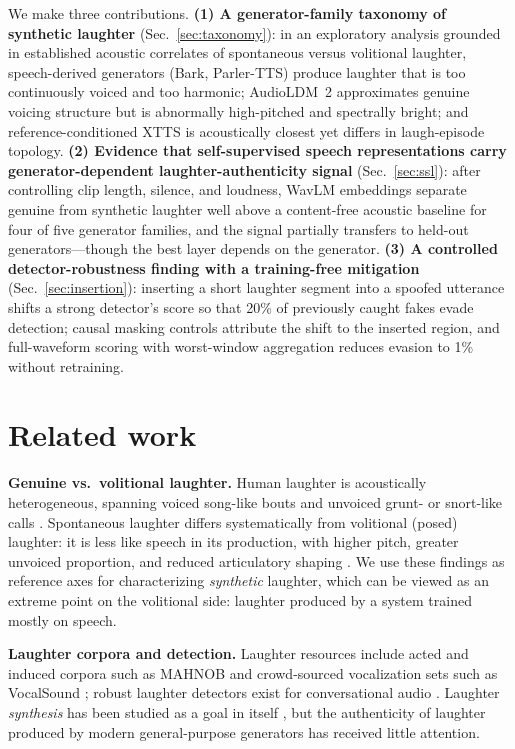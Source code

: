 \documentclass[sigconf,anonymous,review]{acmart}
\begin{document}
We make three contributions. \textbf{(1) A generator-family taxonomy of synthetic laughter} (Sec.~\ref{sec:taxonomy}): in an exploratory analysis grounded in established acoustic correlates of spontaneous versus volitional laughter, speech-derived generators (Bark, Parler-TTS) produce laughter that is too continuously voiced and too harmonic; AudioLDM~2 approximates genuine voicing structure but is abnormally high-pitched and spectrally bright; and reference-conditioned XTTS is acoustically closest yet differs in laugh-episode topology. \textbf{(2) Evidence that self-supervised speech representations carry generator-dependent laughter-authenticity signal} (Sec.~\ref{sec:ssl}): after controlling clip length, silence, and loudness, WavLM embeddings separate genuine from synthetic laughter well above a content-free acoustic baseline for four of five generator families, and the signal partially transfers to held-out generators---though the best layer depends on the generator. \textbf{(3) A controlled detector-robustness finding with a training-free mitigation} (Sec.~\ref{sec:insertion}): inserting a short laughter segment into a spoofed utterance shifts a strong detector's score so that 20\% of previously caught fakes evade detection; causal masking controls attribute the shift to the inserted region, and full-waveform scoring with worst-window aggregation reduces evasion to 1\% without retraining.

\section{Related work}
\textbf{Genuine vs.\ volitional laughter.} Human laughter is acoustically heterogeneous, spanning voiced song-like bouts and unvoiced grunt- or snort-like calls \cite{bachorowski2001acoustic,provine1991laughter}. Spontaneous laughter differs systematically from volitional (posed) laughter: it is less like speech in its production, with higher pitch, greater unvoiced proportion, and reduced articulatory shaping \cite{bryant2014animal,lavan2016laugh,ruch2001expressive}. We use these findings as reference axes for characterizing \emph{synthetic} laughter, which can be viewed as an extreme point on the volitional side: laughter produced by a system trained mostly on speech.

\textbf{Laughter corpora and detection.} Laughter resources include acted and induced corpora such as MAHNOB \cite{petridis2013mahnob} and crowd-sourced vocalization sets such as VocalSound \cite{gong2022vocalsound}; robust laughter detectors exist for conversational audio \cite{gillick2021laughter}. Laughter \emph{synthesis} has been studied as a goal in itself \cite{mori2019laughter}, but the authenticity of laughter produced by modern general-purpose generators has received little attention.
\end{document}
